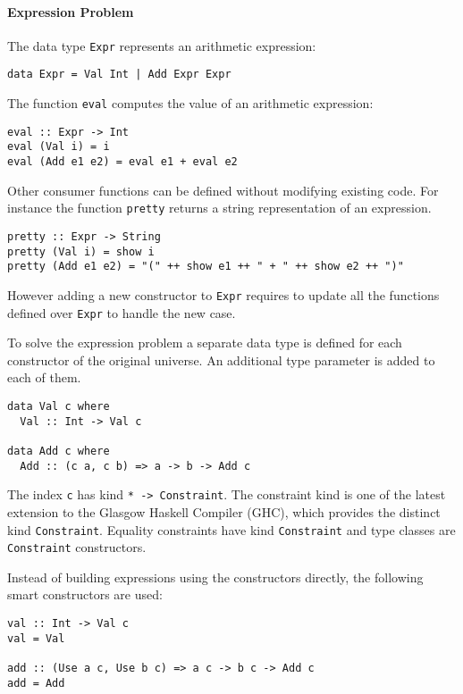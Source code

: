 \documentclass[../Thesis.tex]{subfiles}
\begin{document}
\paragraph{Expression Problem}
The data type \texttt{Expr} represents an arithmetic expression:
\begin{verbatim}
data Expr = Val Int | Add Expr Expr
\end{verbatim}

The function \texttt{eval} computes the value of an arithmetic expression:
\begin{verbatim}
eval :: Expr -> Int
eval (Val i) = i
eval (Add e1 e2) = eval e1 + eval e2
\end{verbatim}

Other consumer functions can be defined without modifying existing code.
For instance the function \texttt{pretty} returns a string representation of an expression.

\begin{verbatim}
pretty :: Expr -> String
pretty (Val i) = show i
pretty (Add e1 e2) = "(" ++ show e1 ++ " + " ++ show e2 ++ ")"
\end{verbatim}

However adding a new constructor to \texttt{Expr} requires to update
all the functions defined over \texttt{Expr} to handle the new case.

To solve the expression problem a separate data type is defined for 
each constructor of the original universe.
An additional type parameter is added to each of them.

\begin{verbatim}
data Val c where
  Val :: Int -> Val c
  
data Add c where
  Add :: (c a, c b) => a -> b -> Add c
\end{verbatim}

The index \texttt{c} has kind \texttt{* -> Constraint}.
The constraint kind is one of the latest extension to the Glasgow Haskell Compiler (GHC), which provides the distinct kind \texttt{Constraint}.
Equality constraints have kind \texttt{Constraint} and
type classes are \texttt{Constraint} constructors.

Instead of building expressions using the constructors directly, the following smart constructors are used:

\begin{verbatim}
val :: Int -> Val c
val = Val

add :: (Use a c, Use b c) => a c -> b c -> Add c
add = Add 
\end{verbatim}
\end{document}

